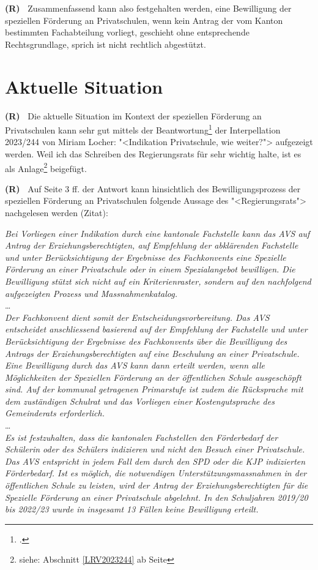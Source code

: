 \documentclass[paper=a4,fontsize=12pt, oneside, numbers=noenddot]{scrbook}
\newcounter{rz}
\newcommand{\Rz}{
	\addtocounter{rz}{1}\textbf{(R\arabic{rz})~}
}
\newcommand{\footnoteExt}[1]{\footnote{siehe: Abschnitt \ref{#1} ab Seite \pageref{#1}}}
\begin{document}
\Rz Zusammenfassend kann also festgehalten werden, eine Bewilligung der speziellen Förderung an Privatschulen, wenn kein Antrag der vom Kanton bestimmten Fachabteilung vorliegt, geschieht ohne entsprechende Rechtsgrundlage, sprich ist nicht rechtlich abgestützt.




\section{Aktuelle Situation}
\Rz Die aktuelle Situation im Kontext der speziellen Förderung an Privatschulen kann sehr gut mittels der Beantwortung\footcite{LRV2023_244} der Interpellation 2023/244 von Miriam Locher: "<Indikation Privatschule, wie weiter?"> aufgezeigt werden. Weil ich das Schreiben des Regierungsrats für sehr wichtig halte, ist es als Anlage\footnoteExt{LRV2023244} beigefügt.

\Rz Auf Seite 3 ff. der Antwort kann hinsichtlich des Bewilligungsprozess der speziellen Förderung an Privatschulen folgende Aussage des "<Regierungsrats"> nachgelesen werden (Zitat):

\begin{addmargin}[2.5em]{0em}\emph{Bei Vorliegen einer Indikation durch eine kantonale Fachstelle kann das AVS auf Antrag der Erziehungsberechtigten, auf Empfehlung der abklärenden Fachstelle und unter Berücksichtigung der Ergebnisse des Fachkonvents eine Spezielle Förderung an einer Privatschule oder in einem Spezialangebot bewilligen. Die Bewilligung stützt sich nicht auf ein Kriterienraster, sondern auf den nachfolgend aufgezeigten Prozess und Massnahmenkatalog.}\\
\dots\\
\emph{Der Fachkonvent dient somit der Entscheidungsvorbereitung. Das AVS entscheidet anschliessend basierend auf der Empfehlung der Fachstelle und unter Berücksichtigung der Ergebnisse des Fachkonvents über die Bewilligung des Antrags der Erziehungsberechtigten auf eine Beschulung an einer Privatschule. Eine Bewilligung durch das AVS kann dann erteilt werden, wenn alle Möglichkeiten der Speziellen Förderung an der öffentlichen Schule ausgeschöpft sind. Auf der kommunal getragenen Primarstufe ist zudem die Rücksprache mit dem zuständigen Schulrat und das Vorliegen einer Kostengutsprache des Gemeinderats erforderlich.}\\
\dots\\
\emph{Es ist festzuhalten, dass die kantonalen Fachstellen den Förderbedarf der Schülerin oder des Schülers indizieren und nicht den Besuch einer Privatschule. Das AVS entspricht in jedem Fall dem durch den SPD oder die KJP indizierten Förderbedarf. Ist es möglich, die notwendigen Unterstützungsmassnahmen in der öffentlichen Schule zu leisten, wird der Antrag der Erziehungsberechtigten für die Spezielle Förderung an einer Privatschule abgelehnt. In den Schuljahren 2019/20 bis 2022/23 wurde in insgesamt 13 Fällen keine Bewilligung erteilt.}
\end{addmargin}
\end{document}
